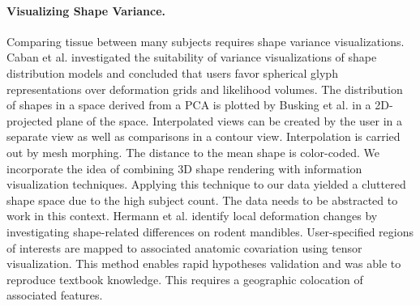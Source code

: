 \documentclass[journal]{style/vgtc} 			          %
\begin{document}
\paragraph{Visualizing Shape Variance.}
Comparing tissue between many subjects requires shape variance visualizations.
%
Caban et al. \cite{Caban2011} investigated the suitability of variance visualizations of shape distribution models and concluded that users favor spherical glyph representations over deformation grids and likelihood volumes.
%
The distribution of shapes in a space derived from a PCA is plotted by Busking et al. \cite{Busking2010a} in a 2D-projected plane of the space.
%
Interpolated views can be created by the user in a separate view as well as comparisons in a contour view.
%
Interpolation is carried out by mesh morphing.
%
The distance to the mean shape is color-coded.
%
We incorporate the idea of combining 3D shape rendering with information visualization techniques.
%
Applying this technique to our data yielded a cluttered shape space due to the high subject count.
%
The data needs to be abstracted to work in this context.
%
Hermann et al. \cite{Hermann2014} identify local deformation changes by investigating shape-related differences on rodent mandibles.
%
User-specified regions of interests are mapped to associated anatomic covariation using tensor visualization.
%
This method enables rapid hypotheses validation and was able to reproduce textbook knowledge.
%
%
This requires a geographic colocation of associated features.
%

\end{document}
